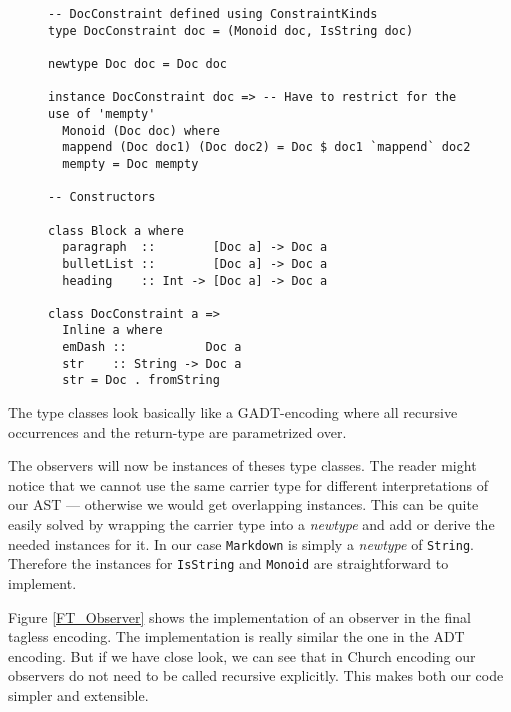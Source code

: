 \begin{figure}
\begin{lstlisting}
-- DocConstraint defined using ConstraintKinds
type DocConstraint doc = (Monoid doc, IsString doc)

newtype Doc doc = Doc doc

instance DocConstraint doc => -- Have to restrict for the use of 'mempty'
  Monoid (Doc doc) where
  mappend (Doc doc1) (Doc doc2) = Doc $ doc1 `mappend` doc2
  mempty = Doc mempty

-- Constructors

class Block a where
  paragraph  ::        [Doc a] -> Doc a
  bulletList ::        [Doc a] -> Doc a
  heading    :: Int -> [Doc a] -> Doc a

class DocConstraint a =>
  Inline a where
  emDash ::           Doc a
  str    :: String -> Doc a
  str = Doc . fromString
\end{lstlisting}
\end{figure}

The type classes look basically like a GADT-encoding where all recursive
occurrences and the return-type are parametrized over.

The observers will now be instances of theses type classes. The reader might
notice that we cannot use the same carrier type for different interpretations of
our AST — otherwise we would get overlapping instances. This can be quite easily
solved by wrapping the carrier type into a \emph{newtype} and add or derive the
needed instances for it. In our case \texttt{Markdown} is simply a
\emph{newtype} of \texttt{String}. Therefore the instances for \texttt{IsString}
and \texttt{Monoid} are straightforward to implement.

Figure \ref{FT_Observer} shows the implementation of an observer in the final
tagless encoding. The implementation is really similar the one in the
ADT encoding. But if we have close look, we can see that in Church encoding our
observers do not need to be called recursive explicitly. This makes both our
code simpler and extensible.

